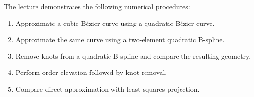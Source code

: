 \documentclass[dvipdfmx,11pt,a4paper,uplatex]{jsarticle}
\begin{document}
The lecture demonstrates the following numerical procedures:

\begin{enumerate}
\item Approximate a cubic Bézier curve using a quadratic Bézier curve.
\item Approximate the same curve using a two-element quadratic B-spline.
\item Remove knots from a quadratic B-spline and compare the resulting geometry.
\item Perform order elevation followed by knot removal.
\item Compare direct approximation with least-squares projection.
\end{enumerate}
\end{document}
